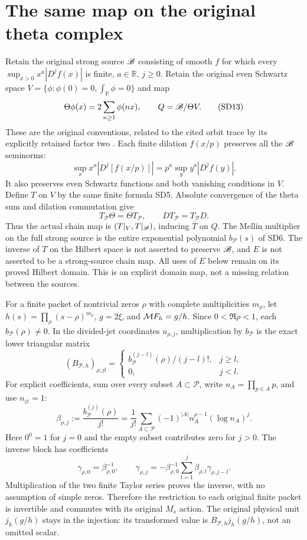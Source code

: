 \section{The same map on the original theta complex}
Retain the original strong source $\mathscr B$ consisting of smooth $f$ for
which every $\sup_{x>0}x^a|D^jf(x)|$ is finite, $a\in\mathbb R$,
$j\ge0$. Retain the original even Schwartz space
$V=\{\phi:\phi(0)=0,\int_\mathbb R\phi=0\}$ and map
\[
 \Theta\phi(x)=2\sum_{n\ge1}\phi(nx),\qquad Q=\mathscr B/\Theta V.
                                                               \tag{SD13}
\]
These are the original conventions, related to the cited orbit trace
by its explicitly retained factor two \cite{swdual:CCtrace,swdual:Meyer}.
Each finite dilation $f(x/p)$ preserves all the $\mathscr B$ seminorms:
\[
 \sup_x x^a|D^j[f(x/p)]|=p^a\sup_y y^a|D^jf(y)|.
\]
It also preserves even Schwartz functions and both vanishing
conditions in $V$. Define $T$ on $V$ by the same finite formula SD5.
Absolute convergence of the theta sum and dilation commutation give
\[
 T_{\mathcal P}\Theta=\Theta T_{\mathcal P},\qquad
 DT_{\mathcal P}=T_{\mathcal P}D.                             \tag{SD14}
\]
Thus the actual chain map is $(T|_V,T|_\mathscr B)$, inducing $\overline T$
on $Q$. The Mellin multiplier on the full strong source is the
entire exponential polynomial $b_{\mathcal P}(s)$ of SD6.
The inverse of $T$ on the Hilbert space is not asserted to preserve
$\mathscr B$, and $E$ is not asserted to be a strong-source chain map.
All uses of $E$ below remain on its proved Hilbert domain. This is
an explicit domain map, not a missing relation between the sources.

For a finite packet of nontrivial zeros $\rho$ with complete
multiplicities $m_\rho$, let $h(s)=\prod_\rho(s-\rho)^{m_\rho}$,
$g=2\xi$, and $\mathcal M F_h=g/h$. Since $0<\Re\rho<1$,
each $b_{\mathcal P}(\rho)\ne0$. In the divided-jet coordinates
$u_{\rho,j}$, multiplication by $b_{\mathcal P}$ is the exact
lower triangular matrix
\[
 (B_{\mathcal P,h})_{\rho;jl}=
 \begin{cases} b_{\mathcal P}^{(j-l)}(\rho)/(j-l)!,&j\ge l,\\
 0,&j<l.\end{cases}                                          \tag{SD15}
\]
For explicit coefficients, sum over every subset $A\subset\mathcal P$,
write $n_A=\prod_{p\in A}p$, and use $n_\varnothing=1$:
\[
 \beta_{\rho,j}:=\frac{b_{\mathcal P}^{(j)}(\rho)}{j!}
 =\frac1{j!}\sum_{A\subset\mathcal P}(-1)^{|A|}
          n_A^{\rho-1}(\log n_A)^j.                           \tag{SD16}
\]
Here $0^0=1$ for $j=0$ and the empty subset contributes zero for
$j>0$. The inverse block has coefficients
\[
 \gamma_{\rho,0}=\beta_{\rho,0}^{-1},\qquad
 \gamma_{\rho,j}=-\beta_{\rho,0}^{-1}
               \sum_{l=1}^j\beta_{\rho,l}\gamma_{\rho,j-l}.
                                                               \tag{SD17}
\]
Multiplication of the two finite Taylor series proves the inverse,
with no assumption of simple zeros. Therefore the restriction to
each original finite packet is invertible and commutes with its
original $M_s$ action. The original physical unit $j_h(g/h)$ stays
in the injection: its transformed value is
$B_{\mathcal P,h}j_h(g/h)$, not an omitted scalar.

